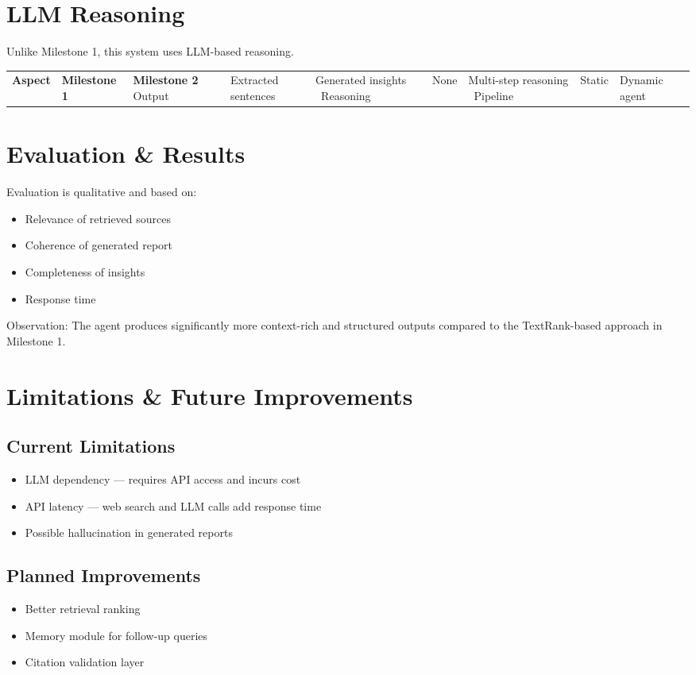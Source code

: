 \documentclass[11pt]{article}
\begin{document}
\section{LLM Reasoning}

Unlike Milestone 1, this system uses LLM-based reasoning.

\begin{tabular}{lll}
\toprule
\textbf{Aspect} & \textbf{Milestone 1} & \textbf{Milestone 2} \
\midrule
Output & Extracted sentences & Generated insights \
Reasoning & None & Multi-step reasoning \
Pipeline & Static & Dynamic agent \
\bottomrule
\end{tabular}

\section{Evaluation & Results}

Evaluation is qualitative and based on:
\begin{itemize}
\item Relevance of retrieved sources
\item Coherence of generated report
\item Completeness of insights
\item Response time
\end{itemize}

Observation: The agent produces significantly more context-rich and structured outputs compared to the TextRank-based approach in Milestone 1.

\section{Limitations & Future Improvements}

\subsection*{Current Limitations}
\begin{itemize}
\item LLM dependency — requires API access and incurs cost
\item API latency — web search and LLM calls add response time
\item Possible hallucination in generated reports
\end{itemize}

\subsection*{Planned Improvements}
\begin{itemize}
\item Better retrieval ranking
\item Memory module for follow-up queries
\item Citation validation layer
\end{itemize}
\end{document}
